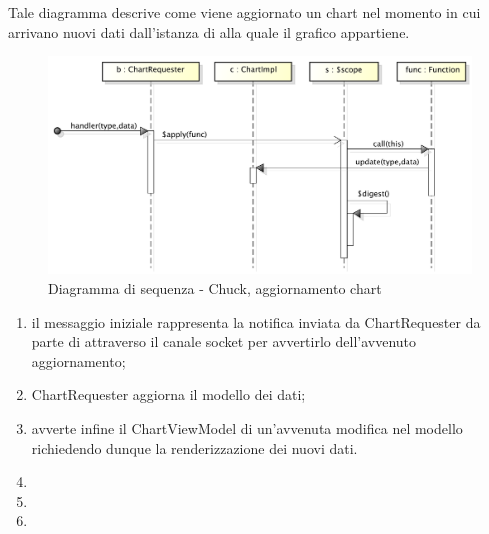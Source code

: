             Tale diagramma descrive come viene aggiornato un chart nel momento in cui arrivano nuovi dati dall'istanza di  alla quale il grafico appartiene.
            \begin{figure}[H]
                \centering
                \includegraphics[scale=0.3]{DefinizioneDiProdotto/Pics/ChuckAggiornamentoChart}
                \caption{Diagramma di sequenza - Chuck, aggiornamento chart}
            \end{figure}
            \begin{enumerate}
                \item il messaggio iniziale rappresenta la notifica inviata da ChartRequester da parte di  attraverso il canale socket per avvertirlo dell'avvenuto aggiornamento;
                \item ChartRequester aggiorna il modello dei dati;
                \item avverte infine il ChartViewModel di un'avvenuta modifica nel modello richiedendo dunque la renderizzazione dei nuovi dati.
                \item
                \item
                \item
            \end{enumerate}
